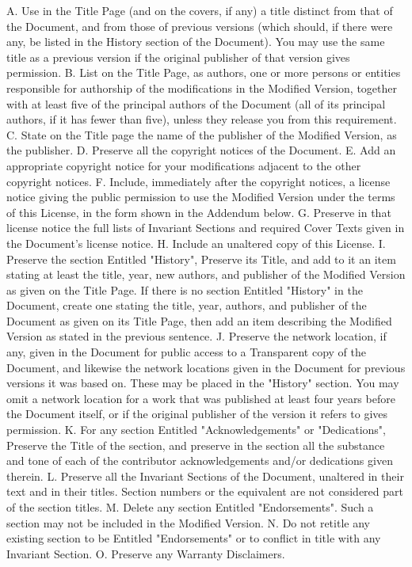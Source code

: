 \documentclass[11pt,a4paper]{article}
\begin{document}
\begin{scriptsize}
A. Use in the Title Page (and on the covers, if any) a title distinct
   from that of the Document, and from those of previous versions
   (which should, if there were any, be listed in the History section
   of the Document).  You may use the same title as a previous version
   if the original publisher of that version gives permission.
B. List on the Title Page, as authors, one or more persons or entities
   responsible for authorship of the modifications in the Modified
   Version, together with at least five of the principal authors of the
   Document (all of its principal authors, if it has fewer than five),
   unless they release you from this requirement.
C. State on the Title page the name of the publisher of the
   Modified Version, as the publisher.
D. Preserve all the copyright notices of the Document.
E. Add an appropriate copyright notice for your modifications
   adjacent to the other copyright notices.
F. Include, immediately after the copyright notices, a license notice
   giving the public permission to use the Modified Version under the
   terms of this License, in the form shown in the Addendum below.
G. Preserve in that license notice the full lists of Invariant Sections
   and required Cover Texts given in the Document's license notice.
H. Include an unaltered copy of this License.
I. Preserve the section Entitled "History", Preserve its Title, and add
   to it an item stating at least the title, year, new authors, and
   publisher of the Modified Version as given on the Title Page.  If
   there is no section Entitled "History" in the Document, create one
   stating the title, year, authors, and publisher of the Document as
   given on its Title Page, then add an item describing the Modified
   Version as stated in the previous sentence.
J. Preserve the network location, if any, given in the Document for
   public access to a Transparent copy of the Document, and likewise
   the network locations given in the Document for previous versions
   it was based on.  These may be placed in the "History" section.
   You may omit a network location for a work that was published at
   least four years before the Document itself, or if the original
   publisher of the version it refers to gives permission.
K. For any section Entitled "Acknowledgements" or "Dedications",
   Preserve the Title of the section, and preserve in the section all
   the substance and tone of each of the contributor acknowledgements
   and/or dedications given therein.
L. Preserve all the Invariant Sections of the Document,
   unaltered in their text and in their titles.  Section numbers
   or the equivalent are not considered part of the section titles.
M. Delete any section Entitled "Endorsements".  Such a section
   may not be included in the Modified Version.
N. Do not retitle any existing section to be Entitled "Endorsements"
   or to conflict in title with any Invariant Section.
O. Preserve any Warranty Disclaimers.


\end{scriptsize}
\end{document}
